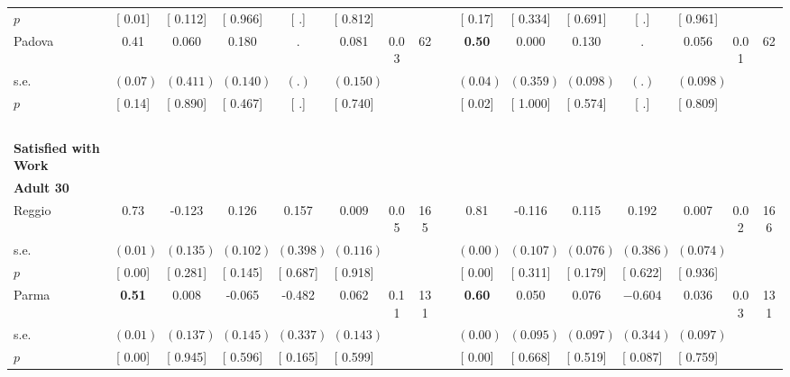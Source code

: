 \begin{longtable}{L{8em} c c c c c c c p{1em} c c c c c c c}
\quad \quad \quad \quad $ p$ & [     0.01] & [    0.112] & [    0.966] & [        .] & [    0.812] & & & & [     0.17] & [    0.334] & [    0.691] & [        .] & [    0.961] & &  \\[1em]
\quad \quad \quad Padova& 0.41 &     0.060 &     0.180 &         . &     0.081 &      0.03 &        62 & & \textbf{     0.50} &     0.000 &     0.130 &         . &     0.056 &      0.01 &        62  \\*
\quad \quad \quad \quad s.e.& $ (     0.07)$ & $ (    0.411)$ & $ (    0.140)$ & $ (        .)$ & $ (    0.150)$ & & & & $ (     0.04)$ & $ (    0.359)$ & $ (    0.098)$ & $ (        .)$ & $ (    0.098)$ & &  \\*
\quad \quad \quad \quad $ p$ & [     0.14] & [    0.890] & [    0.467] & [        .] & [    0.740] & & & & [     0.02] & [    1.000] & [    0.574] & [        .] & [    0.809] & &  \\[1em]
~\\[1em]
\textbf{Satisfied with Work} \\*
\quad \quad \textbf{Adult 30} & & & & & & & & & & & & & & & \\* 
\quad \quad \quad Reggio& 0.73 &    -0.123 &     0.126 &     0.157 &     0.009 &      0.05 &       165 & & 0.81 &    -0.116 &     0.115 &     0.192 &     0.007 &      0.02 &       166  \\*
\quad \quad \quad \quad s.e.& $ (     0.01)$ & $ (    0.135)$ & $ (    0.102)$ & $ (    0.398)$ & $ (    0.116)$ & & & & $ (     0.00)$ & $ (    0.107)$ & $ (    0.076)$ & $ (    0.386)$ & $ (    0.074)$ & &  \\*
\quad \quad \quad \quad $ p$ & [     0.00] & [    0.281] & [    0.145] & [    0.687] & [    0.918] & & & & [     0.00] & [    0.311] & [    0.179] & [    0.622] & [    0.936] & &  \\[1em]
\quad \quad \quad Parma& \textbf{     0.51} &     0.008 &    -0.065 &    -0.482 &     0.062 &      0.11 &       131 & & \textbf{     0.60} &     0.050 &     0.076 & $ \mathbf{   -0.604}$ &     0.036 &      0.03 &       131  \\*
\quad \quad \quad \quad s.e.& $ (     0.01)$ & $ (    0.137)$ & $ (    0.145)$ & $ (    0.337)$ & $ (    0.143)$ & & & & $ (     0.00)$ & $ (    0.095)$ & $ (    0.097)$ & $ (    0.344)$ & $ (    0.097)$ & &  \\*
\quad \quad \quad \quad $ p$ & [     0.00] & [    0.945] & [    0.596] & [    0.165] & [    0.599] & & & & [     0.00] & [    0.668] & [    0.519] & [    0.087] & [    0.759] & &  \\[1em]

\end{longtable}
